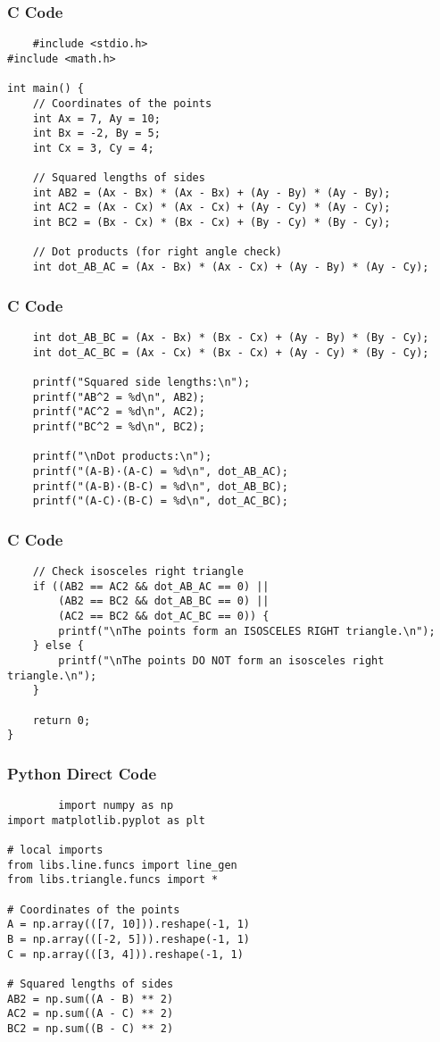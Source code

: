 \documentclass{beamer}
\begin{document}
\begin{frame}[fragile]
		\frametitle{C Code}
		\begin{lstlisting}
    #include <stdio.h>
#include <math.h>

int main() {
    // Coordinates of the points
    int Ax = 7, Ay = 10;
    int Bx = -2, By = 5;
    int Cx = 3, Cy = 4;

    // Squared lengths of sides
    int AB2 = (Ax - Bx) * (Ax - Bx) + (Ay - By) * (Ay - By);
    int AC2 = (Ax - Cx) * (Ax - Cx) + (Ay - Cy) * (Ay - Cy);
    int BC2 = (Bx - Cx) * (Bx - Cx) + (By - Cy) * (By - Cy);

    // Dot products (for right angle check)
    int dot_AB_AC = (Ax - Bx) * (Ax - Cx) + (Ay - By) * (Ay - Cy);
    \end{lstlisting}
    \end{frame}
    \begin{frame}[fragile]
		\frametitle{C Code}
		\begin{lstlisting}
    int dot_AB_BC = (Ax - Bx) * (Bx - Cx) + (Ay - By) * (By - Cy);
    int dot_AC_BC = (Ax - Cx) * (Bx - Cx) + (Ay - Cy) * (By - Cy);

    printf("Squared side lengths:\n");
    printf("AB^2 = %d\n", AB2);
    printf("AC^2 = %d\n", AC2);
    printf("BC^2 = %d\n", BC2);

    printf("\nDot products:\n");
    printf("(A-B)·(A-C) = %d\n", dot_AB_AC);
    printf("(A-B)·(B-C) = %d\n", dot_AB_BC);
    printf("(A-C)·(B-C) = %d\n", dot_AC_BC);
 \end{lstlisting}
    \end{frame}
    \begin{frame}[fragile]
		\frametitle{C Code}
		\begin{lstlisting}
    // Check isosceles right triangle
    if ((AB2 == AC2 && dot_AB_AC == 0) ||
        (AB2 == BC2 && dot_AB_BC == 0) ||
        (AC2 == BC2 && dot_AC_BC == 0)) {
        printf("\nThe points form an ISOSCELES RIGHT triangle.\n");
    } else {
        printf("\nThe points DO NOT form an isosceles right triangle.\n");
    }

    return 0;
}
\end{lstlisting}
\end{frame}
 \begin{frame}[fragile]
		\frametitle{Python Direct Code}
		\begin{lstlisting}
        import numpy as np
import matplotlib.pyplot as plt

# local imports
from libs.line.funcs import line_gen
from libs.triangle.funcs import *

# Coordinates of the points
A = np.array(([7, 10])).reshape(-1, 1)
B = np.array(([-2, 5])).reshape(-1, 1)
C = np.array(([3, 4])).reshape(-1, 1)

# Squared lengths of sides
AB2 = np.sum((A - B) ** 2)
AC2 = np.sum((A - C) ** 2)
BC2 = np.sum((B - C) ** 2)
\end{lstlisting}
\end{frame}
\end{document}
